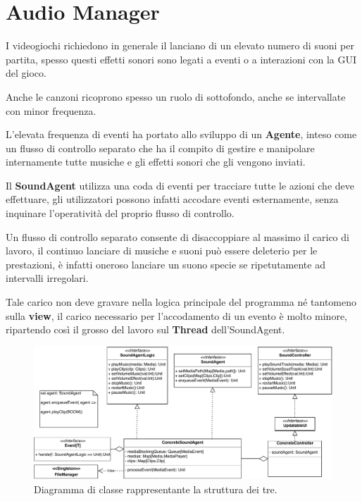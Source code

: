 \section{Audio Manager}
\label{sec:audio_manager_design}
I videogiochi richiedono in generale il lanciano di un elevato numero di suoni per partita, spesso questi effetti sonori sono legati a eventi o a interazioni con la GUI del gioco.

Anche le canzoni ricoprono spesso un ruolo di sottofondo, anche se intervallate con minor frequenza.

L'elevata frequenza di eventi ha portato allo sviluppo di un \textbf{Agente}, inteso come un flusso di controllo separato che ha il compito di gestire e manipolare internamente tutte musiche e gli effetti sonori che gli vengono inviati.


Il \textbf{SoundAgent} utilizza una coda di eventi per tracciare tutte le azioni che deve effettuare, gli utilizzatori possono infatti accodare eventi esternamente, senza inquinare l'operatività del proprio flusso di controllo.

Un flusso di controllo separato consente di disaccoppiare al massimo il carico di lavoro, il continuo lanciare di musiche e suoni può essere deleterio per le prestazioni, è infatti oneroso lanciare un suono specie se ripetutamente ad intervalli irregolari.

Tale carico non deve gravare nella logica principale del programma né tantomeno sulla \textbf{view}, il carico necessario per l'accodamento di un evento è molto minore, ripartendo così il grosso del lavoro sul \textbf{Thread} dell'SoundAgent.



\begin{figure}[H]
	\centering
	\includegraphics[width=0.90\columnwidth]{drawio/audioAgent/audioAgent.pdf}
	\caption{Diagramma di classe rappresentante la struttura dei tre.}
	\label{fig:AudioAgent}
\end{figure}